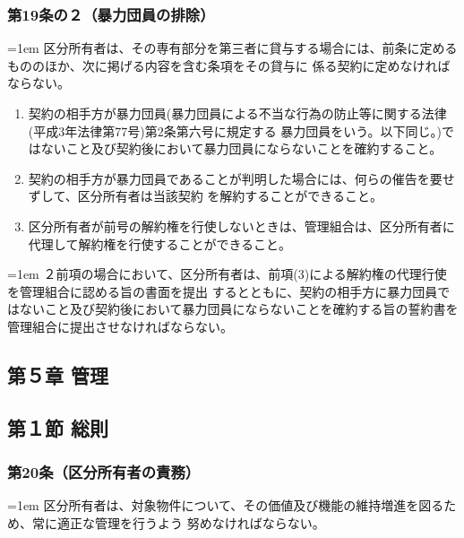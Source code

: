 \documentclass[
  twoside,
  luatex,
  paper=a4paper,
  fontsize=11pt,
  jafontsize=11pt,
  jlreq_notes,
]{jlreq}
\newcommand{\joumain}[1]{%
  \noindent\hangindent=1em\hangafter=1
  \hspace{1em}#1%
}
\newcommand{\kou}[2]{%
  \par\noindent\hangindent=1em\hangafter=1
  #1\hspace{1em}#2%
}
\begin{document}
  \subsubsection*{第19条の２（暴力団員の排除）}
  \joumain{区分所有者は、その専有部分を第三者に貸与する場合には、前条に定めるもののほか、次に掲げる内容を含む条項をその貸与に
  係る契約に定めなければならない。}
  \begin{enumerate}
    \item 契約の相手方が暴力団員(暴力団員による不当な行為の防止等に関する法律(平成3年法律第77号)第2条第六号に規定する
    暴力団員をいう。以下同じ。)ではないこと及び契約後において暴力団員にならないことを確約すること。
    \item 契約の相手方が暴力団員であることが判明した場合には、何らの催告を要せずして、区分所有者は当該契約
    を解約することができること。
    \item 区分所有者が前号の解約権を行使しないときは、管理組合は、区分所有者に代理して解約権を行使することができること。
    \end{enumerate}
  \kou{２}{前項の場合において、区分所有者は、前項(3)による解約権の代理行使を管理組合に認める旨の書面を提出
  するとともに、契約の相手方に暴力団員ではないこと及び契約後において暴力団員にならないことを確約する旨の誓約書を
  管理組合に提出させなければならない。}
  
  \begin{center}
  \subsection*{第５章 管理}
  \subsection*{第１節 総則}
  \end{center}

  \subsubsection*{第20条（区分所有者の責務）}
  \joumain{区分所有者は、対象物件について、その価値及び機能の維持増進を図るため、常に適正な管理を行うよう
  努めなければならない。}
\end{document}
